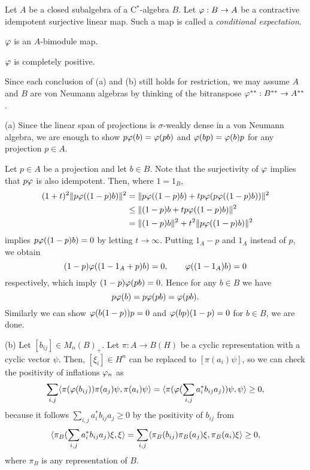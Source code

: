 \documentclass{../../large}
\begin{document}
\begin{prb}
Let $A$ be a closed subalgebra of a C$^*$-algebra $B$.
Let $\varphi:B\to A$ be a contractive idempotent surjective linear map.
Such a map is called a \emph{conditional expectation}.
\begin{parts}
\item $\varphi$ is an $A$-bimodule map.
\item $\varphi$ is completely positive.
\end{parts}
\end{prb}

\begin{pf}
Since each conclusion of (a) and (b) still holds for restriction, we may assume $A$ and $B$ are von Neumann algebras by thinking of the bitranspose $\varphi^{**}:B^{**}\to A^{**}$.

(a)
Since the linear span of projections is $\sigma$-weakly dense in a von Neumann algebra, we are enough to show $p\varphi(b)=\varphi(pb)$ and $\varphi(bp)=\varphi(b)p$ for any projection $p\in A$.

Let $p\in A$ be a projection and let $b\in B$.
Note that the surjectivity of $\varphi$ implies that $p\varphi$ is also idempotent.
Then, where $1=1_B$,
\begin{align*}
(1+t)^2\|p\varphi((1-p)b)\|^2
&=\|p\varphi((1-p)b)+tp\varphi(p\varphi((1-p)b))\|^2\\
&\le\|(1-p)b+tp\varphi((1-p)b)\|^2\\
&=\|(1-p)b\|^2+t^2\|p\varphi((1-p)b)\|^2
\end{align*}
implies $p\varphi((1-p)b)=0$ by letting $t\to\infty$.
Putting $1_A-p$ and $1_A$ instead of $p$, we obtain
\[(1-p)\varphi((1-1_A+p)b)=0,\qquad\varphi((1-1_A)b)=0\]
respectively, which imply $(1-p)\varphi(pb)=0$.
Hence for any $b\in B$ we have
\[p\varphi(b)=p\varphi(pb)=\varphi(pb).\]
Similarly we can show $\varphi(b(1-p))p=0$ and $\varphi(bp)(1-p)=0$ for $b\in B$, we are done.

(b)
Let $[b_{ij}]\in M_n(B)_+$.
Let $\pi:A\to B(H)$ be a cyclic representation with a cyclic vector $\psi$.
Then, $[\xi_i]\in H^n$ can be replaced to $[\pi(a_i)\psi]$, so we can check the positivity of inflations $\varphi_n$ as
\[\sum_{i,j}\langle\pi(\varphi(b_{ij}))\pi(a_j)\psi,\pi(a_i)\psi\rangle=\langle\pi(\varphi(\sum_{i,j}a_i^*b_{ij}a_j))\psi,\psi\rangle\ge0,\]
because it follows $\sum_{i,j}a_i^*b_{ij}a_j\ge0$ by the positivity of $b_{ij}$ from
\[\langle\pi_B(\sum_{i,j}a_i^*b_{ij}a_j)\xi,\xi\rangle=\sum_{i,j}\langle\pi_B(b_{ij})\pi_B(a_j)\xi,\pi_B(a_i)\xi\rangle\ge0,\]
where $\pi_B$ is any representation of $B$.
\end{pf}
\end{document}
